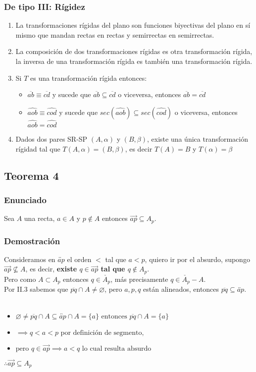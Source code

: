 \documentclass[a4paper]{article}
\begin{document}
\subsubsection{De tipo III: Rígidez}
\begin{enumerate}
    \item La transformaciones rígidas del plano son funciones biyectivas del plano en sí mismo que mandan rectas en rectas y semirrectas en semirrectas.
    \item La composición de dos transformaciones rígidas es otra transformación rígida, la inversa de una transformación rígida es también una transformación rígida. 
    \item Si $T$ es una transformación rígida entonces:
    \begin{itemize}
        \item $\overline{ab} \equiv \overline{cd}$ y sucede que $\overline{ab} \subseteq \overline{cd}$ o viceversa, entonces $\overline{ab}= \overline{cd}$
        \item $\hat{aob} \equiv \hat{cod}$  y sucede que $sec(\hat{aob}) \subseteq sec(\hat{cod})$ o viceversa, entonces $\hat{aob} = \hat{cod}$
    \end{itemize}
    \item Dados dos pares SR-SP $(A,\alpha)$ y $(B,\beta)$, existe una única transformación rígidad tal que $T(A,\alpha)=(B,\beta)$, es decir $T(A)=B$ y $T(\alpha)=\beta$
\end{enumerate}
\subsection{Teorema 4}
\subsubsection{Enunciado}
Sea $A$ una recta, $a \in A$ y $p \notin A$ entonces $\overrightarrow{ap} \subseteq A_p$.
\subsubsection{Demostración}
Consideramos en $\overleftrightarrow{ap}$ el orden $<$ tal que $a<p$, quiero ir por el absurdo, supongo $\overrightarrow{ap}\nsubseteq A$, es decir, \textbf{existe $q \in \overrightarrow{ap}$ tal que $q \notin A_p$}.\\
Pero como $A \subset A_p$ entonces $q \in \check{A_p}$, más precisamente $q \in \check{A_p}- A$.\\
Por II.3 sabemos que $\overline{pq} \cap A \neq \varnothing$, pero $a,p,q$ están alineados, entonces $\overline{pq} \subseteq\overleftrightarrow{ap}$.\\\\
\begin{itemize}
    \item $\varnothing \neq \overline{pq} \cap A \subseteq \overleftrightarrow{ap} \cap A =\{a\} \text{ entonces } \overline{pq} \cap A=\{a\}$
    \item $\implies q<a<p \text{ por definición de segmento,}$
    \item $\text{pero } q \in \overrightarrow{ap} \implies a<q \text{ lo cual resulta absurdo}$
\end{itemize}
$\therefore \overrightarrow{ap} \subseteq A_p$
\end{document}
